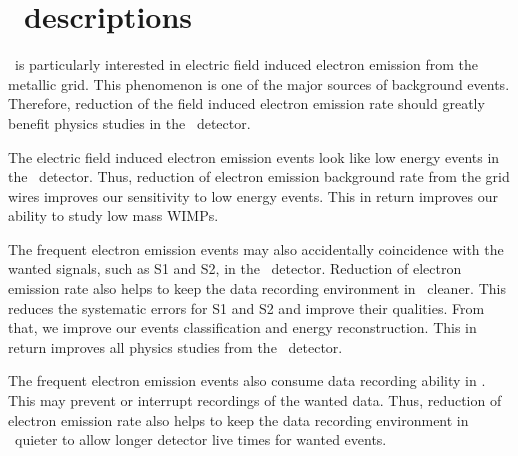 \chapter{\gtest\ descriptions}
\label{chap:gtestdescription}

\lze\ is particularly interested in electric field induced electron emission from the metallic grid. This phenomenon is one of the major sources of background events. Therefore, reduction of the field induced electron emission rate should greatly benefit physics studies in the \lze\ detector.

The electric field induced electron emission events look like low energy events in the \lze\ detector. Thus, reduction of electron emission background rate from the grid wires improves our sensitivity to low energy events. This in return improves our ability to study low mass WIMPs. 

The frequent electron emission events may also accidentally coincidence with the wanted signals, such as S1 and S2, in the \lze\ detector. Reduction of electron emission rate also helps to keep the data recording environment in \lze\ cleaner. This reduces the systematic errors for S1 and S2 and improve their qualities. From that, we improve our events classification and energy reconstruction. This in return improves all physics studies from the \lze\ detector. 

The frequent electron emission events also consume data recording ability in \lze . This may prevent or interrupt recordings of the wanted data. Thus, reduction of electron emission rate also helps to keep the data recording environment in \lze\ quieter to allow longer detector live times for wanted events.

